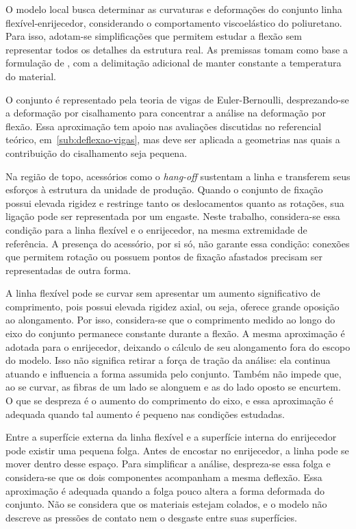 \documentclass[arial,centeredequations,english,brazilian,oneside,section=TITLE]{ifes8}
\begin{document}
O modelo local busca determinar as curvaturas e deformações do conjunto linha flexível-enrijecedor,
considerando o comportamento viscoelástico do poliuretano. Para isso, adotam-se simplificações
que permitem estudar a flexão sem representar todos os detalhes da estrutura real. As premissas
tomam como base a formulação de , com a delimitação
adicional de manter constante a temperatura do material.

O conjunto é representado pela teoria de vigas de Euler-Bernoulli, desprezando-se a deformação
por cisalhamento para concentrar a análise na deformação por flexão. Essa aproximação tem
apoio nas avaliações discutidas no referencial teórico, em~\ref{sub:deflexao-vigas},
mas deve ser aplicada a geometrias nas quais a contribuição do cisalhamento seja pequena.

Na região de topo, acessórios como o \emph{hang-off} sustentam a linha e transferem seus
esforços à estrutura da unidade de produção. Quando o conjunto de fixação possui elevada
rigidez e restringe tanto os deslocamentos quanto as rotações, sua ligação pode ser
representada por um engaste. Neste trabalho, considera-se essa condição para a linha
flexível e o enrijecedor, na mesma extremidade de referência. A presença do acessório, por
si só, não garante essa condição: conexões que permitem rotação ou possuem pontos de fixação
afastados precisam ser representadas de outra forma.

A linha flexível pode se curvar sem apresentar um aumento significativo de comprimento,
pois possui elevada rigidez axial, ou seja, oferece grande oposição ao alongamento. Por isso, 
considera-se que o comprimento medido ao longo do eixo do conjunto permanece constante durante
a flexão. A mesma aproximação é adotada para o enrijecedor, deixando o cálculo de seu 
alongamento fora do escopo do modelo. Isso não significa retirar a força de tração da análise:
ela continua atuando e influencia a forma assumida pelo conjunto. Também não impede que, ao 
se curvar, as fibras de um lado se alonguem e as do lado oposto se encurtem. O que se despreza
é o aumento do comprimento do eixo, e essa aproximação é adequada quando tal aumento é pequeno
nas condições estudadas.

Entre a superfície externa da linha flexível e a superfície interna do enrijecedor pode existir
uma pequena folga. Antes de encostar no enrijecedor, a linha pode se mover dentro desse espaço.
Para simplificar a análise, despreza-se essa folga e considera-se que os dois componentes
acompanham a mesma deflexão. Essa aproximação é adequada quando a folga pouco altera a forma
deformada do conjunto. Não se considera que os materiais estejam colados, e o modelo não
descreve as pressões de contato nem o desgaste entre suas superfícies.
\end{document}
